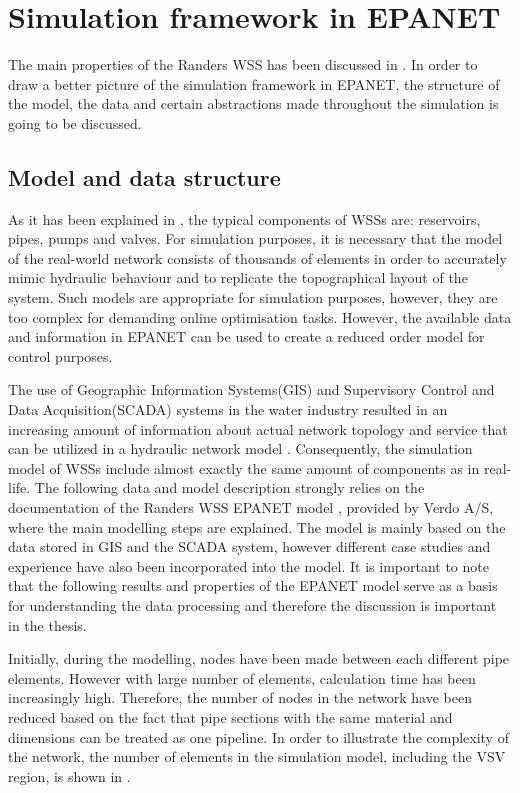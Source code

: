 \section{Simulation framework in EPANET}
\label{simulation_framework_in_EPANET}

The main properties of the Randers WSS has been discussed in . In order to draw a better picture of the simulation framework in EPANET, the structure of the model, the data and certain abstractions made throughout the simulation is going to be discussed. 

\subsection{Model and data structure}
\label{model_data_and_structure}

As it has been explained in , the typical components of WSSs are: reservoirs, pipes, pumps and valves. For simulation purposes, it is necessary that the model of the real-world network consists of thousands of elements in order to accurately mimic hydraulic behaviour and to replicate the topographical layout of the system. Such models are appropriate for simulation purposes, however, they are too complex for demanding online optimisation tasks. However, the available data and information in EPANET can be used to create a reduced order model for control purposes. 

The use of Geographic Information Systems(GIS) and Supervisory Control and Data Acquisition(SCADA) systems in the water industry resulted in an increasing amount of information about actual network topology and service that can be utilized in a hydraulic network model \cite{johnson2016geographic}. Consequently, the simulation model of WSSs include almost exactly the same amount of components as in real-life. The following data and model description strongly relies on the documentation of the Randers WSS EPANET model \cite{verdo_doc}, provided by Verdo A/S, where the main modelling steps are explained. The model is mainly based on the data stored in GIS and the SCADA system, however different case studies and experience have also been incorporated into the model. It is important to note that the following results and properties of the EPANET model serve as a basis for understanding the data processing and therefore the discussion is important in the thesis.  

Initially, during the modelling, nodes have been made between each different pipe elements. However with large number of elements, calculation time has been increasingly high. Therefore, the number of nodes in the network have been reduced based on the fact that pipe sections with the same material and dimensions can be treated as one pipeline. In order to illustrate the complexity of the network, the number of elements in the simulation model, including the VSV region, is shown in .

